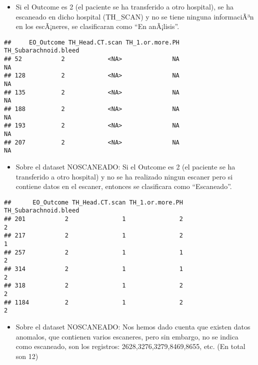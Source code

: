 \documentclass[]{article}
\providecommand{\tightlist}{%
  \setlength{\itemsep}{0pt}\setlength{\parskip}{0pt}}
\begin{document}
\begin{itemize}
\tightlist
\item
  Si el Outcome es 2 (el paciente se ha transferido a otro hospital), se
  ha escaneado en dicho hospital (TH\_SCAN) y no se tiene ninguna
  informaciÃ³n en los escÃ¡neres, se clasificaran como ``En anÃ¡lisis''.
\end{itemize}

\begin{verbatim}
##     EO_Outcome TH_Head.CT.scan TH_1.or.more.PH TH_Subarachnoid.bleed
## 52           2            <NA>              NA                    NA
## 128          2            <NA>              NA                    NA
## 135          2            <NA>              NA                    NA
## 188          2            <NA>              NA                    NA
## 193          2            <NA>              NA                    NA
## 207          2            <NA>              NA                    NA
\end{verbatim}

\begin{itemize}
\tightlist
\item
  Sobre el dataset NOSCANEADO: Si el Outcome es 2 (el paciente se ha
  transferido a otro hospital) y no se ha realizado ningun escaner pero
  si contiene datos en el escaner, entonces se clasificara como
  ``Escaneado''.
\end{itemize}

\begin{verbatim}
##      EO_Outcome TH_Head.CT.scan TH_1.or.more.PH TH_Subarachnoid.bleed
## 201           2               1               2                     2
## 217           2               1               2                     1
## 257           2               1               1                     2
## 314           2               1               1                     2
## 318           2               1               2                     2
## 1184          2               1               2                     2
\end{verbatim}

\begin{itemize}
\tightlist
\item
  Sobre el dataset NOSCANEADO: Nos hemos dado cuenta que existen datos
  anomalos, que contienen varios escaneres, pero sin embargo, no se
  indica como escaneado, son los registros: 2628,3276,3279,8469,8655,
  etc. (En total son 12)
\end{itemize}
\end{document}
